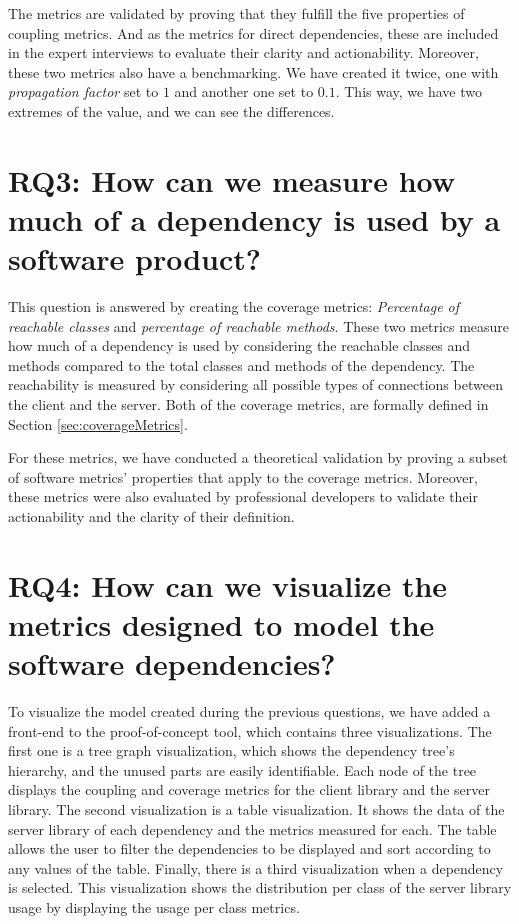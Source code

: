 The metrics are validated by proving that they fulfill the five properties of coupling metrics. And as the metrics for direct dependencies, these are included in the expert interviews to evaluate their clarity and actionability. Moreover, these two metrics also have a benchmarking. We have created it twice, one with \textit{propagation factor} set to $1$ and another one set to $0.1$. This way, we have two extremes of the value, and we can see the differences.

\section{RQ3: How can we measure how much of a dependency is used by a software product?}

This question is answered by creating the coverage metrics: \textit{Percentage of reachable classes} and \textit{percentage of reachable methods}. These two metrics measure how much of a dependency is used by considering the reachable classes and methods compared to the total classes and methods of the dependency. The reachability is measured by considering all possible types of connections between the client and the server. Both of the coverage metrics, are formally defined in Section \ref{sec:coverageMetrics}.

For these metrics, we have conducted a theoretical validation by proving a subset of software metrics' properties that apply to the coverage metrics. Moreover, these metrics were also evaluated by professional developers to validate their actionability and the clarity of their definition.


\section{RQ4: How can we visualize the metrics designed to model the software dependencies?}

To visualize the model created during the previous questions, we have added a front-end to the proof-of-concept tool, which contains three visualizations. The first one is a tree graph visualization, which shows the dependency tree's hierarchy, and the unused parts are easily identifiable. Each node of the tree displays the coupling and coverage metrics for the client library and the server library. The second visualization is a table visualization. It shows the data of the server library of each dependency and the metrics measured for each. The table allows the user to filter the dependencies to be displayed and sort according to any values of the table. Finally, there is a third visualization when a dependency is selected. This visualization shows the distribution per class of the server library usage by displaying the usage per class metrics.

